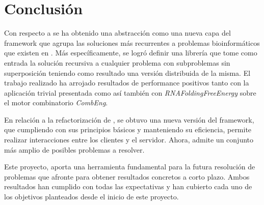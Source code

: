 \chapter{Conclusión}
\label{chap:conclusion}

Con respecto a \rc{} se ha obtenido una abstracción como una nueva capa del framework \fud{} que agrupa las soluciones más recurrentes a 
problemas bioinformáticos que existen en \fude. Más específicamente, se logró definir una librería que tome como entrada la solución
recursiva a cualquier problema con subproblemas sin superposición teniendo como resultado una versión distribuida de la misma.
El trabajo realizado ha arrojado resultados de performance positivos tanto con la aplicación trivial presentada como así también con
\textit{RNAFoldingFreeEnergy} sobre el motor combinatorio \textit{CombEng}.

En relación a la refactorización de \fud{}, se obtuvo una nueva versión del framework, que cumpliendo con sus principios básicos y
manteniendo su eficiencia, permite realizar interacciones entre los clientes y el servidor. Ahora, admite un conjunto más amplio de
posibles problemas a resolver.

Este proyecto, aporta una herramienta fundamental para la futura resolución de problemas que afronte \fude{} para obtener resultados
concretos a corto plazo. Ambos resultados han cumplido con todas las expectativas y han cubierto cada uno de los objetivos
planteados desde el inicio de este proyecto.     
